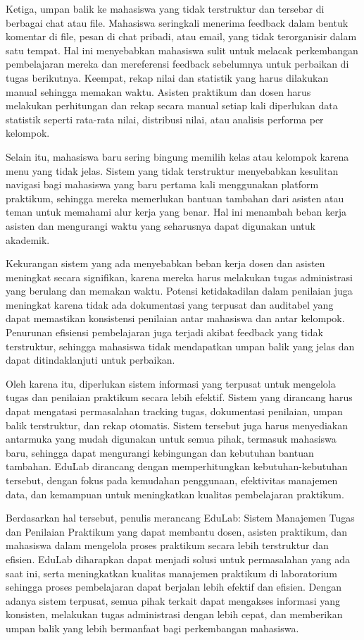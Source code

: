 \documentclass[12pt,a4paper,twoside]{report}
\begin{document}
Ketiga, umpan balik ke mahasiswa yang tidak terstruktur dan tersebar di berbagai chat atau file. Mahasiswa seringkali menerima feedback dalam bentuk komentar di file, pesan di chat pribadi, atau email, yang tidak terorganisir dalam satu tempat. Hal ini menyebabkan mahasiswa sulit untuk melacak perkembangan pembelajaran mereka dan mereferensi feedback sebelumnya untuk perbaikan di tugas berikutnya. Keempat, rekap nilai dan statistik yang harus dilakukan manual sehingga memakan waktu. Asisten praktikum dan dosen harus melakukan perhitungan dan rekap secara manual setiap kali diperlukan data statistik seperti rata-rata nilai, distribusi nilai, atau analisis performa per kelompok.

Selain itu, mahasiswa baru sering bingung memilih kelas atau kelompok karena menu yang tidak jelas. Sistem yang tidak terstruktur menyebabkan kesulitan navigasi bagi mahasiswa yang baru pertama kali menggunakan platform praktikum, sehingga mereka memerlukan bantuan tambahan dari asisten atau teman untuk memahami alur kerja yang benar. Hal ini menambah beban kerja asisten dan mengurangi waktu yang seharusnya dapat digunakan untuk akademik.

Kekurangan sistem yang ada menyebabkan beban kerja dosen dan asisten meningkat secara signifikan, karena mereka harus melakukan tugas administrasi yang berulang dan memakan waktu. Potensi ketidakadilan dalam penilaian juga meningkat karena tidak ada dokumentasi yang terpusat dan auditabel yang dapat memastikan konsistensi penilaian antar mahasiswa dan antar kelompok. Penurunan efisiensi pembelajaran juga terjadi akibat feedback yang tidak terstruktur, sehingga mahasiswa tidak mendapatkan umpan balik yang jelas dan dapat ditindaklanjuti untuk perbaikan.

Oleh karena itu, diperlukan sistem informasi yang terpusat untuk mengelola tugas dan penilaian praktikum secara lebih efektif. Sistem yang dirancang harus dapat mengatasi permasalahan tracking tugas, dokumentasi penilaian, umpan balik terstruktur, dan rekap otomatis. Sistem tersebut juga harus menyediakan antarmuka yang mudah digunakan untuk semua pihak, termasuk mahasiswa baru, sehingga dapat mengurangi kebingungan dan kebutuhan bantuan tambahan. EduLab dirancang dengan memperhitungkan kebutuhan-kebutuhan tersebut, dengan fokus pada kemudahan penggunaan, efektivitas manajemen data, dan kemampuan untuk meningkatkan kualitas pembelajaran praktikum.

Berdasarkan hal tersebut, penulis merancang EduLab: Sistem Manajemen Tugas dan Penilaian Praktikum yang dapat membantu dosen, asisten praktikum, dan mahasiswa dalam mengelola proses praktikum secara lebih terstruktur dan efisien. EduLab diharapkan dapat menjadi solusi untuk permasalahan yang ada saat ini, serta meningkatkan kualitas manajemen praktikum di laboratorium sehingga proses pembelajaran dapat berjalan lebih efektif dan efisien. Dengan adanya sistem terpusat, semua pihak terkait dapat mengakses informasi yang konsisten, melakukan tugas administrasi dengan lebih cepat, dan memberikan umpan balik yang lebih bermanfaat bagi perkembangan mahasiswa.
\end{document}
